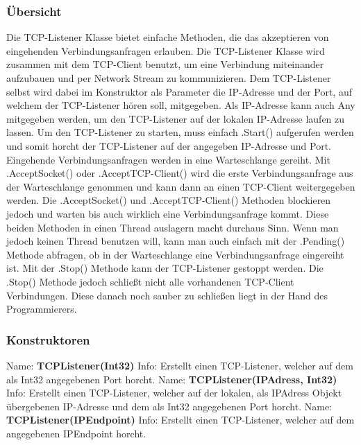 \subsubsection{Übersicht}
Die TCP-Listener Klasse bietet einfache Methoden, die das akzeptieren von eingehenden Verbindungsanfragen erlauben. Die TCP-Listener Klasse wird zusammen mit dem TCP-Client benutzt, um eine Verbindung miteinander aufzubauen und per Network Stream zu kommunizieren. Dem TCP-Listener selbst wird dabei im Konstruktor als Parameter die IP-Adresse und der Port, auf welchem der TCP-Listener hören soll, mitgegeben. Als IP-Adresse kann auch Any mitgegeben werden, um den TCP-Listener auf der lokalen IP-Adresse laufen zu lassen. Um den TCP-Listener zu starten, muss einfach .Start() aufgerufen werden und somit horcht der TCP-Listener auf der angegeben IP-Adresse und Port. Eingehende Verbindungsanfragen werden in eine Warteschlange gereiht. Mit .AcceptSocket() oder .AcceptTCP-Client() wird die erste Verbindungsanfrage aus der Warteschlange genommen und kann dann an einen TCP-Client weitergegeben werden. Die .AcceptSocket() und .AcceptTCP-Client() Methoden blockieren jedoch und warten bis auch wirklich eine Verbindungsanfrage kommt. Diese beiden Methoden in einen Thread auslagern macht durchaus Sinn. Wenn man jedoch keinen Thread benutzen will, kann man auch einfach mit der .Pending() Methode abfragen, ob in der Warteschlange eine Verbindungsanfrage eingereiht ist. Mit der .Stop() Methode kann der TCP-Listener gestoppt werden. Die .Stop() Methode jedoch schließt nicht alle vorhandenen TCP-Client Verbindungen. Diese danach noch sauber zu schließen liegt in der Hand des Programmierers.
\subsubsection{Konstruktoren}
Name: \textbf{TCPListener(Int32)}
\newline
Info: Erstellt einen TCP-Listener, welcher auf dem als Int32 angegebenen Port horcht.
\newline \newline
Name: \textbf{TCPListener(IPAdress, Int32)}
\newline
Info:  Erstellt einen TCP-Listener, welcher auf der lokalen, als IPAdress Objekt übergebenen IP-Adresse und dem als Int32 angegebenen Port horcht.
\newline \newline
Name: \textbf{TCPListener(IPEndpoint)}
\newline
Info: Erstellt einen TCP-Listener, welcher auf dem angegebenen IPEndpoint horcht.
\newline \newline
